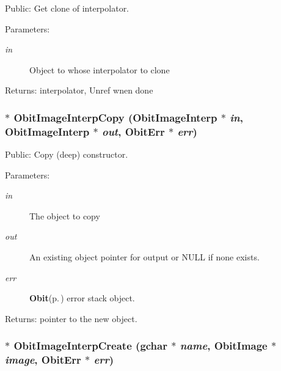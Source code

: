 Public: Get clone of interpolator. 

\begin{Desc}
\item[Parameters:]
\begin{description}
\item[{\em in}]Object to whose interpolator to clone \end{description}
\end{Desc}
\begin{Desc}
\item[Returns:]interpolator, Unref wnen done \end{Desc}
\subsubsection{$\ast$ Obit\-Image\-Interp\-Copy ({\bf Obit\-Image\-Interp} $\ast$ {\em in}, {\bf Obit\-Image\-Interp} $\ast$ {\em out}, {\bf Obit\-Err} $\ast$ {\em err})}\label{ObitImageInterp_8c_a9}


Public: Copy (deep) constructor. 

\begin{Desc}
\item[Parameters:]
\begin{description}
\item[{\em in}]The object to copy \item[{\em out}]An existing object pointer for output or NULL if none exists. \item[{\em err}]{\bf Obit}{\rm (p.\,\pageref{structObit})} error stack object. \end{description}
\end{Desc}
\begin{Desc}
\item[Returns:]pointer to the new object. \end{Desc}
\subsubsection{$\ast$ Obit\-Image\-Interp\-Create (gchar $\ast$ {\em name}, {\bf Obit\-Image} $\ast$ {\em image}, {\bf Obit\-Err} $\ast$ {\em err})}\label{ObitImageInterp_8c_a11}


